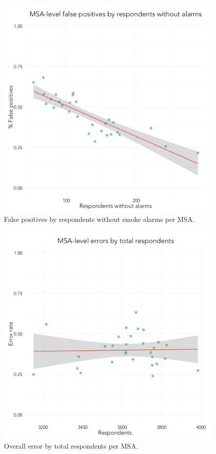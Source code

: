 \documentclass{sig-alternate}
\begin{document}
\begin{figure}
\centering 
\includegraphics[scale=0.42]{rf-msas-metrics-1.png}
\caption{False positives by respondents without smoke alarms per MSA.}
\end{figure}

\begin{figure}
\centering 
\includegraphics[scale=0.42]{rf-msas-metrics-3.png}
\caption{Overall error by total respondents per MSA.}
\end{figure}
\end{document}
